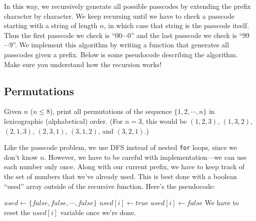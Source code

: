 In this way, we recursively generate all possible passcodes by extending the prefix character by character. We keep recursing until we have to check a passcode starting with a string of length $n$, in which case that string is the passcode itself. Thus the first passcode we check is ``00$\cdots$0'' and the last passcode we check is ``99$\cdots$9''. We implement this algorithm by writing a function that generates all passcodes given a prefix. Below is some pseudocode describing the algorithm. Make sure you understand how the recursion works!

\noindent \begin{minipage}{\textwidth}
  \begin{algorithmic}[1]
      \State {}
      \State \Return
    \EndIf
      \State {}
    \EndFor
    \EndFunction
  \end{algorithmic}
\end{minipage}

\subsection{Permutations}

\begin{typewriter}
  Given $n$ ($n \le 8$), print all permutations of the sequence $\{1, 2, \cdots, n\}$ in lexicographic (alphabetical) order. (For $n=3$, this would be $(1, 2, 3)$, $(1, 3, 2)$, $(2, 1, 3)$, $(2, 3, 1)$, $(3, 1, 2)$, and $(3, 2, 1)$.)
\end{typewriter}

Like the passcode problem, we use DFS instead of nested \texttt{for} loops, since we don't know $n$. However, we have to be careful with implementation---we can use each number only once. Along with our current prefix, we have to keep track of the set of numbers that we've already used. This is best done with a boolean ``used'' array outside of the recursive function. Here's the pseudocode:

\noindent \begin{minipage}{\textwidth}
  \begin{algorithmic}[1]
    \State $used \gets \{false, false, \cdots, false\}$
      \State {}
      \State \Return
    \EndIf
        \State $used[i] \gets true$
        \State {}
        \State $used[i] \gets false$
        \Comment We have to reset the $used[i]$ variable once we're done.
      \EndIf
    \EndFor
    \EndFunction
  \end{algorithmic}
\end{minipage}

